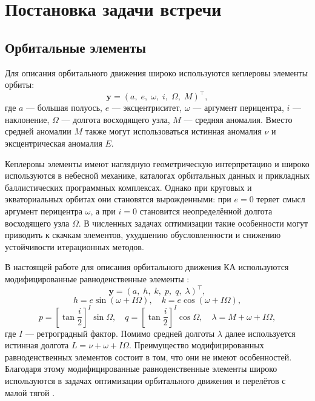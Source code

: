 \section{Постановка задачи встречи}

\subsection{Орбитальные элементы}

Для описания орбитального движения широко используются кеплеровы элементы орбиты:
\begin{equation*}
    \mathbf{y} = \left( a, \; e, \; \omega, \; i, \; \Omega, \; M \right)^\top,
\end{equation*}
где $a$ --- большая полуось, $e$ --- эксцентриситет, $\omega$ --- аргумент перицентра, $i$ --- наклонение, $\Omega$ --- долгота восходящего узла, $M$ --- средняя аномалия. Вместо средней аномалии $M$ также могут использоваться истинная аномалия $\nu$ и эксцентрическая аномалия $E$. 

Кеплеровы элементы имеют наглядную геометрическую интерпретацию и широко используются в небесной механике, каталогах орбитальных данных и прикладных баллистических программных комплексах. Однако при круговых и экваториальных орбитах они становятся вырожденными: при $e=0$ теряет смысл аргумент перицентра $\omega$, а при $i=0$ становится неопределённой долгота восходящего узла $\Omega$. В численных задачах оптимизации такие особенности могут приводить к скачкам элементов, ухудшению обусловленности и снижению устойчивости итерационных методов.

В настоящей работе для описания орбитального движения КА используются модифицированные равноденственные элементы \cite{danielson1995semianalytic}:
\begin{equation*}
    \mathbf{y} = \left( a, \; h, \; k, \; p, \; q, \; \lambda \right)^\top,
\end{equation*}
\begin{equation*}
    h = e \sin (\omega + I \Omega), \quad
    k = e \cos (\omega + I \Omega),
\end{equation*}
\begin{equation*}
    p = \left[ \tan \frac{i}{2} \right]^I \sin \Omega, \quad
    q = \left[ \tan \frac{i}{2} \right]^I \cos \Omega, \quad
    \lambda = M + \omega + I \Omega,
\end{equation*}
где $I$ --- ретроградный фактор. Помимо средней долготы $\lambda$ далее используется истинная
долгота $L = \nu + \omega + I \Omega$. Преимущество модифицированных равноденственных элементов состоит в том, что они не имеют особенностей. Благодаря этому модифицированные равноденственные элементы широко используются в задачах оптимизации орбитального движения и перелётов с малой тягой \cite{betts2000very, graham2015minimum, kechichian2018applied}.

